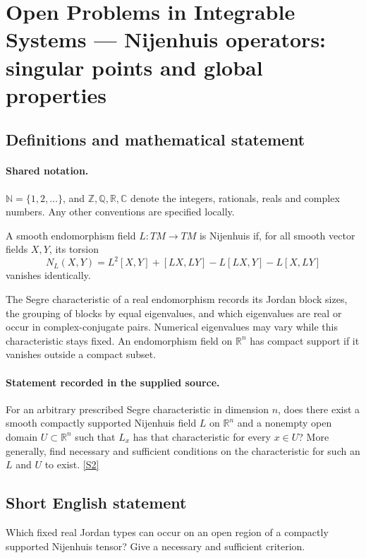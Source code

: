 \documentclass[11pt]{article}
\newcommand{\sref}[2]{\hyperlink{source:#1:#2}{[S#2]}}
\begin{document}
\section{Open Problems in Integrable Systems — Nijenhuis operators: singular points and global properties}\label{statement}

\subsection{Definitions and mathematical statement}

\paragraph{Shared notation.}$\mathbb N=\{1,2,\ldots\}$, and $\mathbb Z,\mathbb Q,\mathbb R,\mathbb C$ denote the integers, rationals, reals and complex numbers. Any other conventions are specified locally.


A smooth endomorphism field $L:TM\to TM$ is Nijenhuis if, for all smooth vector fields $X,Y$, its torsion
\[N_L(X,Y)=L^2[X,Y]+[LX,LY]-L[LX,Y]-L[X,LY]\]
vanishes identically.\par The Segre characteristic of a real endomorphism records its Jordan block sizes, the grouping of blocks by equal eigenvalues, and which eigenvalues are real or occur in complex-conjugate pairs. Numerical eigenvalues may vary while this characteristic stays fixed. An endomorphism field on $\mathbb R^n$ has compact support if it vanishes outside a compact subset.
\paragraph{Statement recorded in the supplied source.}
For an arbitrary prescribed Segre characteristic in dimension $n$, does there exist a smooth compactly supported Nijenhuis field $L$ on $\mathbb R^n$ and a nonempty open domain $U\subset\mathbb R^n$ such that $L_x$ has that characteristic for every $x\in U$? More generally, find necessary and sufficient conditions on the characteristic for such an $L$ and $U$ to exist. \sref{statement}{2}
\subsection{Short English statement}
Which fixed real Jordan types can occur on an open region of a compactly supported Nijenhuis tensor? Give a necessary and sufficient criterion.
\end{document}
